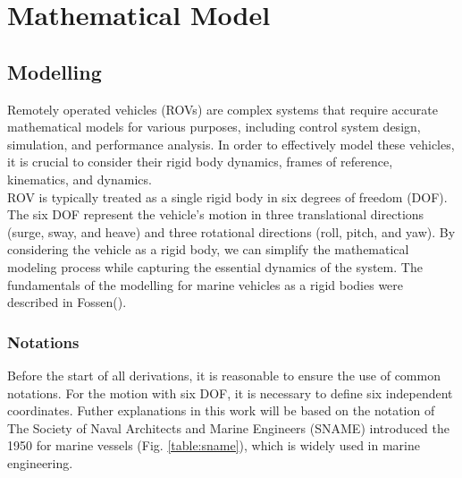 \chapter{Mathematical Model}
\label{chap:lr}

\section*{Modelling}

    Remotely operated vehicles (ROVs) are complex systems that require accurate mathematical models for various purposes, including control system design, simulation, and performance analysis.
    In order to effectively model these vehicles, it is crucial to consider their rigid body dynamics, frames of reference, kinematics, and dynamics.\\
    ROV is typically treated as a single rigid body in six degrees of freedom (DOF). 
    The six DOF represent the vehicle's motion in three translational directions (surge, sway, and heave) and three rotational directions (roll, pitch, and yaw). 
    By considering the vehicle as a rigid body, we can simplify the mathematical modeling process while capturing the essential dynamics of the system.
    The fundamentals of the modelling for marine vehicles as a rigid bodies were described in Fossen().
    
    \subsection*{Notations}

    Before the start of all derivations, it is reasonable to ensure the use of common notations.
    For the motion with six DOF, it is necessary to define six independent coordinates.
    Futher explanations in this work will be based on the notation of The Society of Naval Architects and Marine Engineers (SNAME) introduced the 1950 for marine vessels (Fig. \ref{table:sname}), 
    which is widely used in marine engineering.

